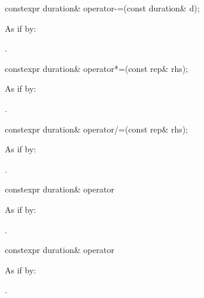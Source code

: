 %
\begin{itemdecl}
constexpr duration& operator-=(const duration& d);
\end{itemdecl}

\begin{itemdescr}
\pnum
\effects As if by: 

\pnum
\returns {}.
\end{itemdescr}

%
\begin{itemdecl}
constexpr duration& operator*=(const rep& rhs);
\end{itemdecl}

\begin{itemdescr}
\pnum
\effects As if by: 

\pnum
\returns {}.
\end{itemdescr}

%
\begin{itemdecl}
constexpr duration& operator/=(const rep& rhs);
\end{itemdecl}

\begin{itemdescr}
\pnum
\effects As if by: 

\pnum
\returns {}.
\end{itemdescr}

%
\begin{itemdecl}
constexpr duration& operator%
\end{itemdecl}

\begin{itemdescr}
\pnum
\effects As if by: 

\pnum
\returns {}.
\end{itemdescr}

%
\begin{itemdecl}
constexpr duration& operator%
\end{itemdecl}

\begin{itemdescr}
\pnum
\effects As if by: 

\pnum
\returns {}.
\end{itemdescr}


